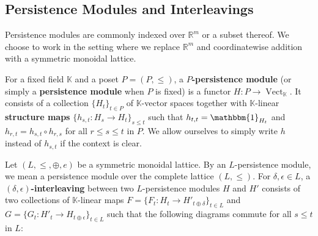 \documentclass[a4paper,11pt]{article}
\newcommand{\Id}{\mathbbm{1}}
\newcommand{\atensor}{\oplus}
\theoremstyle{remark}
\begin{document}
\subsection{Persistence Modules and Interleavings}\label{sec:persistent_homology_modules_and_interleaving_distance}

Persistence modules are commonly indexed over $\mathbb{R}^m$ or a subset thereof. We choose to work in the setting where we replace $\mathbb{R}^m$ and coordinatewise addition with a symmetric monoidal lattice.

For a fixed field $\mathbb{K}$ and a poset $P=(P,\leq)$, a \textbf{$P$-persistence module} (or simply a \textbf{persistence module} when $P$ is fixed) is a functor $H:P\to\operatorname{Vect}_{\mathbb{K}}$. It consists of a collection $\{H_t\}_{t\in P}$ of $\mathbb{K}$-vector spaces together with $\mathbb{K}$-linear \textbf{structure maps} $\{h_{s,t}\colon H_s\to H_t\}_{s\leq t}$ such that $h_{t,t}=\Id_{H_t}$ and $h_{r,t}=h_{s,t}\circ h_{r,s}$ for all $r\leq s\leq t$ in $P$. We allow ourselves to simply write $h$ instead of $h_{s,t}$ if the context is clear.

Let $(L, \leq, \atensor, e)$ be a symmetric monoidal lattice. By an $L$-persistence module, we mean a persistence module over the complete lattice $(L,\leq)$. For $\delta, \epsilon\in L$, a \textbf{$(\delta, \epsilon)$-interleaving} between two $L$-persistence modules $H$ and $H'$ consists of two collections of $\mathbb{K}$-linear maps $F=\{F_t\colon H_t\to H'_{t\atensor\delta}\}_{t\in L}$ and $G=\{G_t\colon H'_t\to H_{t\atensor\epsilon}\}_{t\in L}$ such that the following diagrams commute for all $s\leq t$ in $L$:

\begin{center}

\end{center}
\end{document}
